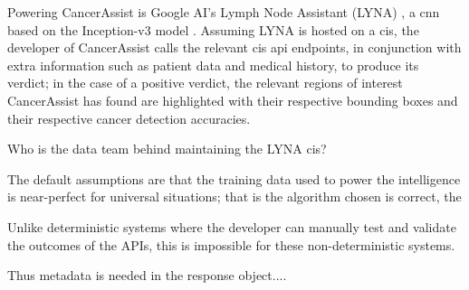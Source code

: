Powering CancerAssist is Google AI's Lymph Node Assistant (LYNA) \citep{Liu:2018fa}, a \gls{cnn} based on the Inception-v3 model \citep{Szegedy:2016ws,Krizhevsky:2012wl}. Assuming LYNA is hosted on a \gls{cis}, the developer of CancerAssist calls the relevant \gls{cis} \gls{api} endpoints, in conjunction with extra information such as patient data and medical history, to produce its verdict; in the case of a positive verdict, the relevant regions of interest CancerAssist has found are highlighted with their respective bounding boxes and their respective cancer detection accuracies.

Who is the data team behind maintaining the LYNA \gls{cis}? 

The default assumptions are that the training data used to power the intelligence is near-perfect for universal situations; that is the algorithm chosen is correct, the 

Unlike deterministic systems where the developer can manually test and validate the outcomes of the APIs, this is impossible for these non-deterministic systems.

Thus metadata is needed in the response object....

